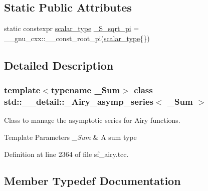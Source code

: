 \subsection*{Static Public Attributes}
\begin{DoxyCompactItemize}
\item 
static constexpr \hyperlink{classstd_1_1____detail_1_1__Airy__asymp__series_ac2d0fa6d86d7a83c06dca057d0dfec3a}{scalar\+\_\+type} \hyperlink{classstd_1_1____detail_1_1__Airy__asymp__series_a0a4d017f86429e22f5939e689e7b93ca}{\+\_\+\+S\+\_\+sqrt\+\_\+pi} = \+\_\+\+\_\+gnu\+\_\+cxx\+::\+\_\+\+\_\+const\+\_\+root\+\_\+pi(\hyperlink{classstd_1_1____detail_1_1__Airy__asymp__series_ac2d0fa6d86d7a83c06dca057d0dfec3a}{scalar\+\_\+type}\{\})
\end{DoxyCompactItemize}


\subsection{Detailed Description}
\subsubsection*{template$<$typename \+\_\+\+Sum$>$\newline
class std\+::\+\_\+\+\_\+detail\+::\+\_\+\+Airy\+\_\+asymp\+\_\+series$<$ \+\_\+\+Sum $>$}

Class to manage the asymptotic series for Airy functions.


\begin{DoxyTemplParams}{Template Parameters}
{\em \+\_\+\+Sum} & A sum type \\
\hline
\end{DoxyTemplParams}


Definition at line 2364 of file sf\+\_\+airy.\+tcc.



\subsection{Member Typedef Documentation}
\mbox{\label{classstd_1_1____detail_1_1__Airy__asymp__series_ac2d0fa6d86d7a83c06dca057d0dfec3a}} 
